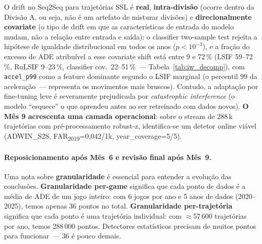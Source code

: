 \documentclass[11pt,a4paper]{article}
\begin{document}
O drift no Seq2Seq para trajet\'orias SSL \'e \textbf{real},
\textbf{intra-divis\~ao} (ocorre dentro da Divis\~ao A, ou seja, n\~ao \'e
um artefato de misturar divis\~oes) e \textbf{direcionalmente covariate}
(o tipo de drift em que as caracter\'isticas de entrada do modelo mudam,
n\~ao a rela\c{c}\~ao entre entrada e sa\'ida): o classifier two-sample
test rejeita a hip\'otese de igualdade distribucional em todos os anos
($p\!<\!10^{-3}$), e a fra\c{c}\~ao do excesso de ADE atribu\'ivel a esse
covariate shift est\'a entre 9 e 72\,\% (LSIF 59--72\,\%, RuLSIF 9--23\,\%,
classifier cov.\ 22--51\,\%~--- Tabela~\ref{tab:iw_decomp}), com
\texttt{accel\_p99} como a feature dominante segundo o LSIF marginal
(o percentil 99 da acelera\c{c}\~ao~--- representa os movimentos mais
bruscos). Contudo, a adapta\c{c}\~ao por fine-tuning leve
\'e severamente prejudicada por \emph{catastrophic interference}
(o modelo ``esquece'' o que aprendeu antes ao ser retreinado com dados novos).
\textbf{O M\^es 9 acrescenta uma camada operacional}: sobre o stream
de 288\,k trajet\'orias com pr\'e-processamento robust-z, identifica-se
um detetor online vi\'avel (ADWIN\_S2S, FAR\textsubscript{2019}=0{,}042/1k,
year\_coverage=5/5).

\paragraph{Reposicionamento ap\'os M\^es~6 e revis\~ao final ap\'os M\^es~9.}
Uma nota sobre \textbf{granularidade} \'e essencial para entender a
evolu\c{c}\~ao das conclus\~oes. \textbf{Granularidade per-game} significa
que cada ponto de dados \'e a m\'edia de ADE de um jogo inteiro: com 6 jogos
por ano e 5 anos de dados (2020--2025), temos apenas 36 pontos no total.
\textbf{Granularidade per-trajet\'oria} significa que cada ponto \'e uma
trajet\'oria individual: com $\approx$57\,600 trajet\'orias por ano, temos
288\,000 pontos. Detectores estat\'isticos precisam de muitos pontos para
funcionar~--- 36 \'e pouco demais.
\end{document}
